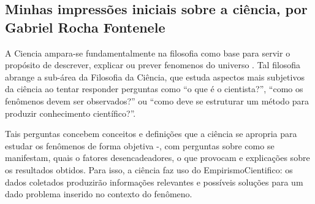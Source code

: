 \subsection{Minhas impressões iniciais sobre a ciência, por Gabriel Rocha Fontenele}

A \gls{Ciencia} ampara-se fundamentalmente na filosofia como base para servir o propósito de descrever, explicar ou prever \gls{fenomeno}s do universo \citep{floridi_blackwell_2004}. Tal filosofia abrange a sub-área da Filosofia da Ciência, que estuda aspectos mais subjetivos da ciência ao tentar responder perguntas como ``o que é o cientista?'', ``como os fenômenos devem ser observados?'' ou ``como deve se estruturar um método para produzir conhecimento científico?''.

Tais perguntas concebem conceitos e definições que a ciência se apropria para estudar os fenômenos de forma objetiva -, com perguntas sobre como se manifestam, quais o fatores desencadeadores, o que provocam e explicações sobre os resultados obtidos. Para isso, a ciência faz uso do \gls{EmpirismoCientifico}: os dados coletados produzirão informações relevantes e possíveis soluções para um dado problema inserido no contexto do fenômeno.